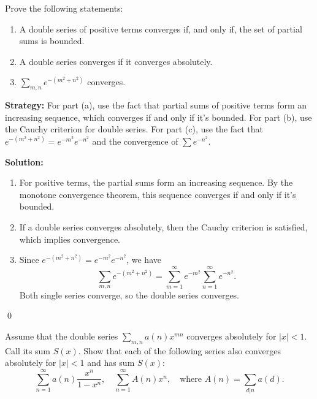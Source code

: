 \begin{problembox}
\begin{problemstatement}
Prove the following statements:
\begin{enumerate}[label=\alph*)]
\item A double series of positive terms converges if, and only if, the set of partial sums is bounded.
\item A double series converges if it converges absolutely.
\item \(\sum_{m,n} e^{-(m^2+n^2)}\) converges.
\end{enumerate}
\end{problemstatement}
\end{problembox}

\noindent\textbf{Strategy:} For part (a), use the fact that partial sums of positive terms form an increasing sequence, which converges if and only if it's bounded. For part (b), use the Cauchy criterion for double series. For part (c), use the fact that \(e^{-(m^2+n^2)} = e^{-m^2} e^{-n^2}\) and the convergence of \(\sum e^{-n^2}\).

\bigskip\noindent\textbf{Solution:}
\begin{enumerate}[label=(\alph*)]
\item For positive terms, the partial sums form an increasing sequence. By the monotone convergence theorem, this sequence converges if and only if it's bounded.

\item If a double series converges absolutely, then the Cauchy criterion is satisfied, which implies convergence.

\item Since \(e^{-(m^2+n^2)} = e^{-m^2} e^{-n^2}\), we have 
\[\sum_{m,n} e^{-(m^2+n^2)} = \sum_{m=1}^{\infty} e^{-m^2} \sum_{n=1}^{\infty} e^{-n^2}.\]
Both single series converge, so the double series converges.
\end{enumerate}\qed



\begin{problembox}
\begin{problemstatement}
Assume that the double series \(\sum_{m,n} a(n)x^{mn}\) converges absolutely for \(|x| < 1\). Call its sum \(S(x)\). Show that each of the following series also converges absolutely for \(|x| < 1\) and has sum \(S(x)\):
\[\sum_{n=1}^{\infty} a(n) \frac{x^n}{1 - x^n}, \quad \sum_{n=1}^{\infty} A(n)x^n, \quad \text{where } A(n) = \sum_{d|n} a(d).\]
\end{problemstatement}
\end{problembox}

